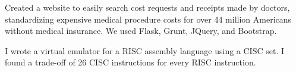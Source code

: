 \documentclass[]{deedy-resume-openfont}
\begin{document}
\begin{minipage}[t]{0.66\textwidth}
\begin{tightemize}
\item Created a website to easily search cost requests and receipts made by doctors, standardizing expensive medical procedure costs for over 44 million Americans without medical insurance. We used Flask, Grunt, JQuery, and Bootstrap.
\end{tightemize}
\sectionsep

\begin{tightemize}
\item I wrote a virtual emulator for a RISC assembly language using a CISC set. I found a trade-off of 26 CISC instructions for every RISC instruction.
\end{tightemize}


\end{minipage} 
\end{document}
